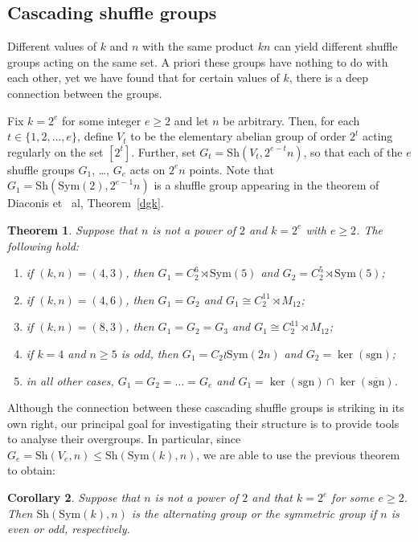 \documentclass[12pt]{amsart}
\newtheorem{thm}{Theorem}[section]
\newtheorem{cor}[thm]{Corollary}
\theoremstyle{remark}
\theoremstyle{definition}
\newcommand{\sym}{\mathrm{Sym}}
\newcommand{\sh}{\mathrm{Sh}}
\begin{document}
\subsection{Cascading shuffle groups}

Different values of $k$ and $n$ with the same product $kn$ can yield different shuffle groups acting on the same set. A priori these groups have nothing to do with each other, yet we have found that for certain values of $k$, there is a deep connection between the groups.

Fix $k=2^e$ for some integer $e \geqslant 2$ and let $n$ be arbitrary. Then, for each $t\in \{1,2,\dots,e\}$, define $V_t$ to be the elementary abelian group of order $2^t$ acting regularly on the set $[2^t]$. Further, set $G_t=\sh(V_t, 2^{e-t}n)$, so that each of the $e$ shuffle groups $G_1$, \dots, $G_e$ acts on $2^en$ points. Note that $G_1= \sh(\sym(2),2^{e-1}n)$ is a shuffle group appearing in the theorem of Diaconis  et ~al, Theorem~\ref{dgk}. 

\begin{thm}
\label{thm:k=2^e}
Suppose that $n$ is not a power of $2$ and $k=2^e$ with $e\geqslant 2$. The  following hold:
\begin{enumerate}
\item if $(k,n)=(4,3)$, then $G_1 = C_2^6\rtimes \sym(5)$ and $G_2 = C_2^5 \rtimes \sym(5)$;
\item if $(k,n)=(4,6)$, then $G_1 =G_2$ and $G_1 \cong C_2^{11} \rtimes M_{12}$;
\item if $(k,n)=(8,3)$, then $G_1 =G_2= G_3$ and $G_1 \cong C_2^{11} \rtimes M_{12}$;
\item if $k=4$ and $n\geqslant 5$ is odd, then $G_1 = C_2 \wr \sym(2n)$ and $G_2 = \ker(\mathrm{sgn})$;
\item in all other cases, $G_1 = G_2 = \dots = G_e$ and $G_1 =\ker(\mathrm{sgn}) \cap \ker( \overline{\mathrm{sgn}})$.
\end{enumerate}
\end{thm}


Although the connection between these cascading shuffle groups is striking in its own right, our principal goal for investigating their structure is to provide tools to analyse their overgroups. In particular, since $G_e = \sh(V_e,n) \leqslant \sh(\sym(k),n)$, we are able to use the previous theorem to obtain:

\begin{cor}
\label{cor:k=2^e}
 Suppose that $n$ is not a power of $2$ and that $k = 2^e$ for some $e\geqslant 2$. Then $\sh(\sym(k),n)$ is the  alternating group  or the symmetric group if $n$ is even or odd, respectively.
\end{cor}
\end{document}
